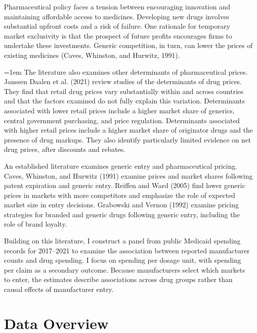 Pharmaceutical policy faces a tension between encouraging innovation and maintaining affordable access to medicines. Developing new drugs involves substantial upfront costs and a risk of failure. One rationale for temporary market exclusivity is that the prospect of future profits encourages firms to undertake these investments. Generic competition, in turn, can lower the prices of existing medicines (Caves, Whinston, and Hurwitz, 1991).

\begingroup
\emergencystretch=1em
The literature also examines other determinants of pharmaceutical prices. Janssen Daalen et al. (2021) review studies of the determinants of drug prices. They find that retail drug prices vary substantially within and across countries and that the factors examined do not fully explain this variation. Determinants associated with lower retail prices include a higher market share of generics, central government purchasing, and price regulation. Determinants associated with higher retail prices include a higher market share of originator drugs and the presence of drug markups. They also identify particularly limited evidence on net drug prices, after discounts and rebates.
\par
\endgroup

An established literature examines generic entry and pharmaceutical pricing. Caves, Whinston, and Hurwitz (1991) examine prices and market shares following patent expiration and generic entry. Reiffen and Ward (2005) find lower generic prices in markets with more competitors and emphasize the role of expected market size in entry decisions. Grabowski and Vernon (1992) examine pricing strategies for branded and generic drugs following generic entry, including the role of brand loyalty.

Building on this literature, I construct a panel from public Medicaid spending records for 2017--2021 to examine the association between reported manufacturer counts and drug spending. I focus on spending per dosage unit, with spending per claim as a secondary outcome. Because manufacturers select which markets to enter, the estimates describe associations across drug groups rather than causal effects of manufacturer entry.

\section{Data Overview}
